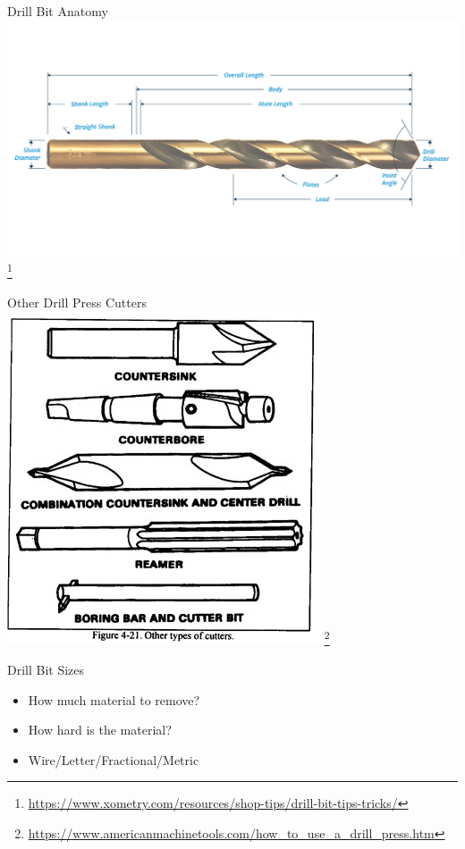 \documentclass[aspectratio=169]{beamer}
\begin{document}
\begin{frame}{Drill Bit Anatomy}
    \centering
    \includegraphics[height=0.7\textheight]{drill_bit_anatomy.jpg} \footnote{\url{https://www.xometry.com/resources/shop-tips/drill-bit-tips-tricks/}}
\end{frame}
\begin{frame}{Other Drill Press Cutters}
    \centering
    \includegraphics[height=0.7\textheight]{drill_press_tools.jpg} \footnote{\url{https://www.americanmachinetools.com/how_to_use_a_drill_press.htm}}
\end{frame}
\begin{frame}{Drill Bit Sizes}
    \begin{itemize}
        \item How much material to remove?
        \item How hard is the material?
        \item Wire/Letter/Fractional/Metric
    \end{itemize}
\end{frame}
\end{document}
